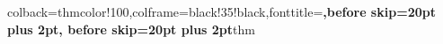 \def\redimensionne{0.76}

\RequirePackage{framed}
\RequirePackage{graphicx}
\RequirePackage{tikz}
\RequirePackage{calc}

\newcommand{\mathem}[1]{$\boldsymbol{#1}$}

\newcommand{\sca}[1]{\lowercase{#1}}
\newcommand{\mat}[1]{\isgreek{#1}\ifthenelse{\boolean{estgrec}}{\matgreektorm{#1}}{\boldsymbol{\mathcal{\uppercase{#1}}}}}



\newcommand{\blue}[1]{\textcolor{blue}{#1}}
\newcommand{\m}[1]{\mathbf{#1}}
\renewcommand{\c}[1]{\mathcal{#1}}
\newcommand{\cp}{\stackrel{\bb {P}}{\longrightarrow}}
\newcommand{\cd}{\stackrel{\mathrm{d}}{\longrightarrow}}
\newcommand{\cost}{L}




\newcommand{\indep}{\rotatebox[origin=c]{90}{$\models$}} %
\newcommand{\loss}{\mathrm{Loss}}
\usepackage{upquote}

\usepackage{tcolorbox}

{colback=thmcolor!100,colframe=black!35!black,fonttitle=\bfseries,before
 skip=20pt plus 2pt, before
 skip=20pt plus 2pt}{thm} %

